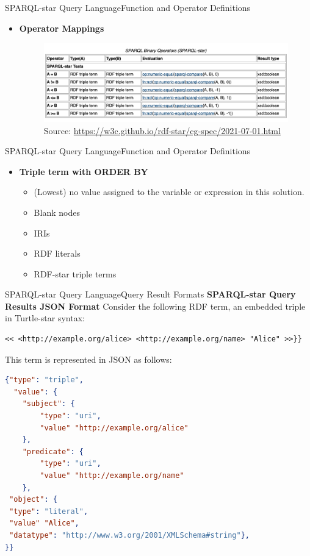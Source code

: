 \documentclass[aspectratio=169]{beamer}
\begin{document}
\begin{frame}{SPARQL-star Query Language}{Function and Operator Definitions}
\begin{itemize}
    \item \textbf{Operator Mappings}
    \begin{figure}
        \centering
        \includegraphics[scale=0.5]{images/SPARQL Binary Operators (SPARQL-star).png}
        \caption{Source: \url{https://w3c.github.io/rdf-star/cg-spec/2021-07-01.html}}
    \end{figure}
\end{itemize}
\end{frame}

\begin{frame}{SPARQL-star Query Language}{Function and Operator Definitions}
\begin{itemize}
    \item \textbf{Triple term with ORDER BY}
    \begin{itemize}
        \item (Lowest) no value assigned to the variable or expression in this solution.
        \item Blank nodes
        \item IRIs
        \item RDF literals
        \item RDF-star triple terms
    \end{itemize}
\end{itemize}
\end{frame}

\begin{frame}[fragile]{SPARQL-star Query Language}{Query Result Formats}
\textbf{SPARQL-star Query Results JSON Format}
        Consider the following RDF term, an embedded triple in Turtle-star syntax:
\begin{lstlisting}[language=TTL ]
<< <http://example.org/alice> <http://example.org/name> "Alice" >>}}
\end{lstlisting}
        This term is represented in JSON as follows:
\begin{lstlisting}[language=JSON, numbers=none,  basicstyle=\tiny, ]
 {"type": "triple",
  "value": {
    "subject": {
        "type": "uri",
        "value" "http://example.org/alice"
    },
    "predicate": {
        "type": "uri",
        "value" "http://example.org/name"
    },
 "object": {
 "type": "literal",
 "value" "Alice",
 "datatype": "http://www.w3.org/2001/XMLSchema#string"},
}}
\end{lstlisting}
\end{frame}
\end{document}
